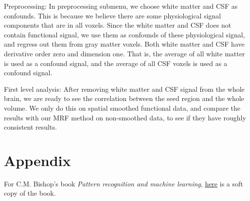 \documentclass[12pt]{article}
\begin{document}
Preprocessing: In preprocessing submenu, we choose white matter and CSF as confounds. This is because we believe there are some physiological signal components that are in all voxels. Since the white matter and CSF does not contain functional signal, we use them as confounds of these physiological signal, and regress out them from gray matter voxels. Both white matter and CSF have derivative order zero and dimension one. That is, the average of all white matter is used as a confound signal, and the average of all CSF voxels is used as a confound signal.

First level analysis: After removing white matter and CSF signal from the whole brain, we are ready to see the correlation between the seed region and the whole volume. We only do this on spatial smoothed functional data, and compare the results with our MRF method  on non-smoothed data, to see if they have roughly consistent results.




\section{Appendix}
For C.M. Bishop's book \emph{Pattern recognition and machine learning}, \href{http://www.sci.utah.edu/~weiliu/books/prml.tar.gz}{here} is a soft copy of the book.



\end{document}
